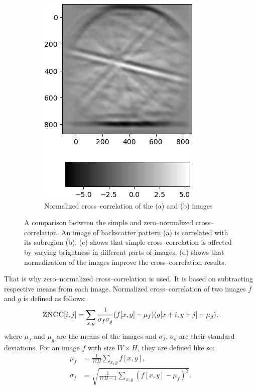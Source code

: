 \begin{figure}
\begin{subfigure}{.49\textwidth}
		\includegraphics[width=\linewidth]{img/normalized_corr}
		\caption{Normalized cross--correlation of the (a) and (b) images}
		\label{normalized-cross}
	\end{subfigure}
	
	\caption{A comparison between the simple and zero--normalized cross--correlation. An image of backscatter pattern (a) is correlated with its subregion (b). (c) shows that simple cross--correlation is affected by varying brightness in different parts of images. (d) shows that normalization of the images improve the cross--correlation results.}
\end{figure}

That is why zero--normalized cross--correlation is used. It is based on subtracting respective means from each image. Normalized cross--correlation of two images $f$ and $g$ is defined as follows:
\[
\textsc{ZNCC}[i,j] = \sum_{x, y} \frac{1}{\sigma_f \sigma_g}(f[x,y] - \mu_f)(g[x+i,y+j] - \mu_g),
\]  
where $\mu_f$ and $\mu_g$ are the means of the images and $\sigma_f$, $\sigma_g$ are their standard deviations. For an image $f$ with size $W \times H$, they are defined like so:
\begin{align*}
\mu_f &= \frac{1}{WH} \sum_{x,y}{}f[x,y], \\
\sigma_f &= \sqrt{\frac{1}{WH-1} \sum_{x,y}(f[x,y]-\mu_f)^2}.
\end{align*}


